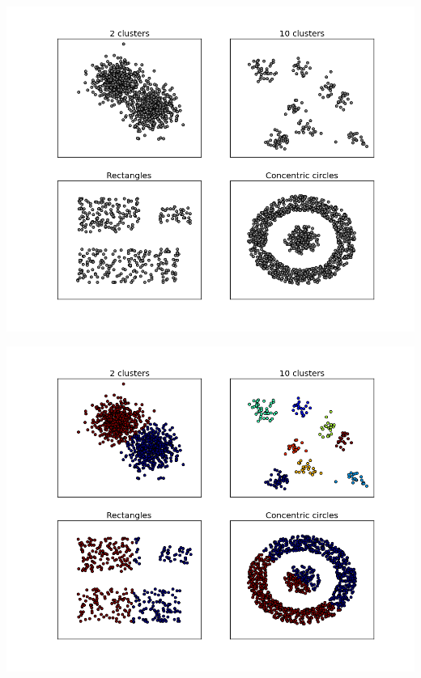 \documentclass[10pt]{beamer}
\begin{document}
\begin{frame}

\begin{center}
\includegraphics[width=\textwidth]{images/datasets.png}
\end{center}

\end{frame}

\begin{frame}

\begin{center}
\includegraphics[width=\textwidth]{images/datasets_km.png}
\end{center}

\end{frame}
\end{document}
